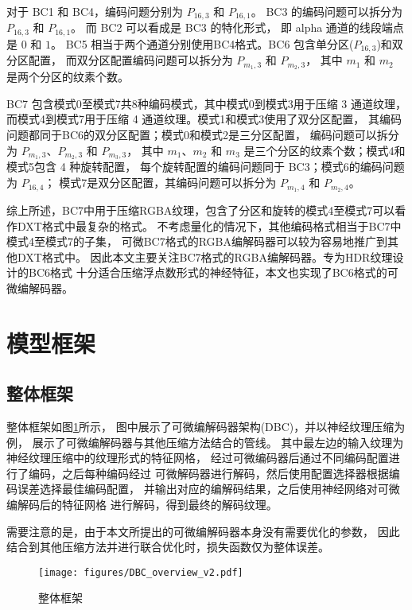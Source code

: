 对于 BC1 和 BC4，编码问题分别为 $P_{16,3}$ 和 $P_{16,1}$。
BC3 的编码问题可以拆分为 $P_{16,3}$ 和 $P_{16,1}$。
而 BC2 可以看成是 BC3 的特化形式，
即 alpha 通道的线段端点是 $0$ 和 $1$。
BC5 相当于两个通道分别使用BC4格式。BC6 包含单分区($P_{16,3}$)和双分区配置，
而双分区配置编码问题可以拆分为 $P_{m_1,3}$ 和 $P_{m_2,3}$，
其中 $m_1$ 和 $m_2$ 是两个分区的纹素个数。

BC7 包含模式0至模式7共8种编码模式，其中模式0到模式3用于压缩 3 通道纹理，
而模式4到模式7用于压缩 4 通道纹理。模式1和模式3使用了双分区配置，
其编码问题都同于BC6的双分区配置；模式0和模式2是三分区配置，
编码问题可以拆分为 $P_{m_1,3}$、$P_{m_2,3}$ 和 $P_{m_3,3}$，
其中 $m_1$、$m_2$ 和 $m_3$ 是三个分区的纹素个数；模式4和模式5包含 4 种旋转配置，
每个旋转配置的编码问题同于 BC3；模式6的编码问题为 $P_{16,4}$；
模式7是双分区配置，其编码问题可以拆分为  $P_{m_1,4}$ 和 $P_{m_2,4}$。

综上所述，BC7中用于压缩RGBA纹理，包含了分区和旋转的模式4至模式7可以看作DXT格式中最复杂的格式。
不考虑量化的情况下，其他编码格式相当于BC7中模式4至模式7的子集，
可微BC7格式的RGBA编解码器可以较为容易地推广到其他DXT格式中。
因此本文主要关注BC7格式的RGBA编解码器。专为HDR纹理设计的BC6格式
十分适合压缩浮点数形式的神经特征，本文也实现了BC6格式的可微编解码器。


\section{模型框架}

\subsection{整体框架}

整体框架如图\ref{fig:DBC_overview}所示，
图中展示了可微编解码器架构(DBC)，并以神经纹理压缩为例，
展示了可微编解码器与其他压缩方法结合的管线。
其中最左边的输入纹理为神经纹理压缩中的纹理形式的特征网格，
经过可微编码器后通过不同编码配置进行了编码，之后每种编码经过
可微解码器进行解码，然后使用配置选择器根据编码误差选择最佳编码配置，
并输出对应的编解码结果，之后使用神经网络对可微编解码后的特征网格
进行解码，得到最终的解码纹理。

需要注意的是，由于本文所提出的可微编解码器本身没有需要优化的参数，
因此结合到其他压缩方法并进行联合优化时，损失函数仅为整体误差。

\begin{figure}[htbp]
    \centering
    \texttt{[image: figures/DBC\_overview\_v2.pdf]}
    \caption{整体框架}
    \label{fig:DBC_overview}
\end{figure}



